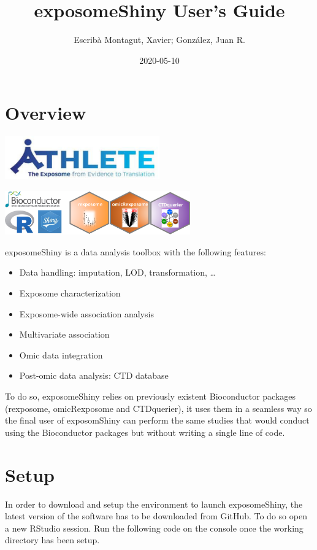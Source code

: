 \documentclass[
]{book}
\title{exposomeShiny User's Guide}
\author{Escribà Montagut, Xavier; González, Juan R.}
\date{2020-05-10}
\providecommand{\tightlist}{%
  \setlength{\itemsep}{0pt}\setlength{\parskip}{0pt}}
\begin{document}
\maketitle

{
\setcounter{tocdepth}{1}
\tableofcontents
}
\hypertarget{overview}{%
\chapter{Overview}\label{overview}}

\includegraphics[width=0.5\textwidth,height=\textheight]{images/athlete.png}

\includegraphics[width=0.6\textwidth,height=\textheight]{images/logo.png}

exposomeShiny is a data analysis toolbox with the following features:

\begin{itemize}
\tightlist
\item
  Data handling: imputation, LOD, transformation, \ldots{}
\item
  Exposome characterization
\item
  Exposome-wide association analysis
\item
  Multivariate association
\item
  Omic data integration
\item
  Post-omic data analysis: CTD database
\end{itemize}

To do so, exposomeShiny relies on previously existent Bioconductor packages (rexposome, omicRexposome and CTDquerier), it uses them in a seamless way so the final user of exposomShiny can perform the same studies that would conduct using the Bioconductor packages but without writing a single line of code.

\hypertarget{setup}{%
\chapter{Setup}\label{setup}}

In order to download and setup the environment to launch exposomeShiny, the latest version of the software has to be downloaded from GitHub. To do so open a new RStudio session. Run the following code on the console once the working directory has been setup.
\end{document}
